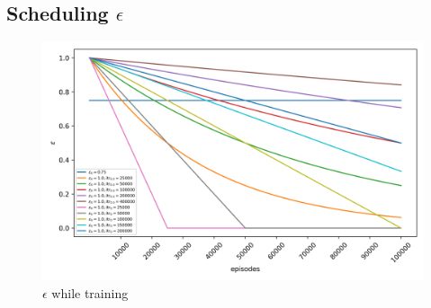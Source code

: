 \subsection{Scheduling $\epsilon$}
\begin{figure}[H]
    \centering
    \includegraphics[width=0.5\linewidth]{plots/part1-d-epsilons.png}
    \caption{$\epsilon$ while training}
    \label{fig:part1-d-epsilons}
\end{figure}
